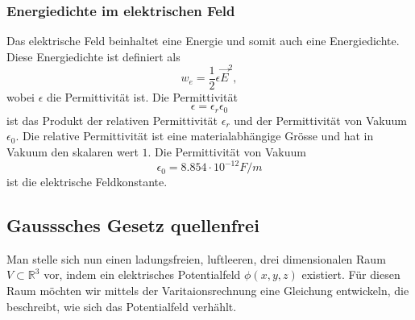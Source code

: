 \subsubsection{Energiedichte im elektrischen Feld}
Das elektrische Feld beinhaltet eine Energie und somit auch eine Energiedichte.
Diese Energiedichte ist definiert als
\begin{equation}
w_e
=
\frac{1}{2} \epsilon \vec{E} ^2,
\label{maxwell:section:definiton_energiedichte_elektrischesFeld}
\end{equation}
wobei $\epsilon$ die Permittivität ist.
Die Permittivität
\[
\epsilon
=
\epsilon_r \epsilon_0
\]
ist das Produkt der relativen Permittivität $\epsilon_r$ und der Permittivität von Vakuum $\epsilon_0$.
Die relative Permittivität ist eine materialabhängige Grösse und hat in Vakuum den skalaren wert $1$.
Die Permittivität von Vakuum
\[
\epsilon_0
=
8.854 \cdot 10^{-12} F/m
\]
ist die elektrische Feldkonstante.


\subsection{Gausssches Gesetz quellenfrei
	\label{maxwell:section:elektrostatik_ohne_quelle}}
Man stelle sich nun einen ladungsfreien, luftleeren, drei dimensionalen Raum $V\subset\mathbb{R}^3$
vor, indem ein elektrisches Potentialfeld $\phi(x,y,z)$ existiert.
Für diesen Raum möchten wir mittels der Varitaionsrechnung eine Gleichung entwickeln, die beschreibt, wie sich das Potentialfeld verhählt. 

